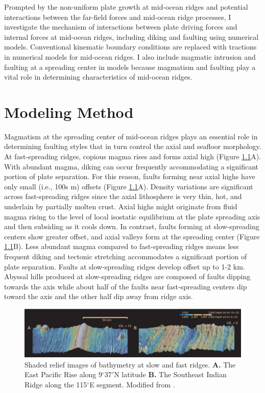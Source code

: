 \documentclass[letterpaper,12pt,notitle]{memphisthesis}                     %
\begin{document}
Prompted by the non-uniform plate growth at mid-ocean ridges and potential interactions between the far-field forces and mid-ocean ridge processes, I investigate the mechanism of interactions between plate driving forces and internal forces at mid-ocean ridges, including diking and faulting using numerical models. Conventional kinematic boundary conditions are replaced with tractions in numerical models for mid-ocean ridges. I also include magmatic intrusion and faulting at a spreading center in models because magmatism and faulting play a vital role in determining characteristics of mid-ocean ridges. 

\chapter{Modeling Method}

Magmatism at the spreading center of mid-ocean ridges plays an essential role in determining faulting styles that in turn control the axial and seafloor morphology. At fast-spreading ridges, copious magma rises and forms axial high (Figure \ref{fig:ridgebathymetry}A). With abundant magma, diking can occur frequently accommodating a significant portion of plate separation. For this reason, faults forming near axial highs have only small (i.e., 100s m) offsets (Figure \ref{fig:ridgebathymetry}A). Density variations are significant across fast-spreading ridges since the axial lithosphere is very thin, hot, and underlain by partially molten crust. Axial highs might originate from fluid magma rising to the level of local isostatic equilibrium at the plate spreading axis and then subsiding as it cools down. In contrast, faults forming at slow-spreading centers show greater offset, and axial valleys form at the spreading center (Figure \ref{fig:ridgebathymetry}B). Less abundant magma compared to fast-spreading ridges means less frequent diking and tectonic stretching accommodates a significant portion of plate separation. Faults at slow-spreading ridges develop offset up to 1-2 km. Abyssal hills produced at slow-spreading ridges are composed of faults dipping towards the axis while about half of the faults near fast-spreading centers dip toward the axis and the other half dip away from ridge axis.

\begin{figure}[!htb]
	\centering
	\includegraphics[width=0.99\linewidth]{./figs/bathy_buck.png}
	\caption{Shaded relief images of bathymetry at slow and fast ridges. \textbf{A.} The East Pacific Rise along 9$^\circ$37$'$N latitude \textbf{B.} The Southeast Indian Ridge along the 115$^\circ$E segment. Modified from \citet{Buck2005}.}
	\label{fig:ridgebathymetry}
\end{figure}
\end{document}
